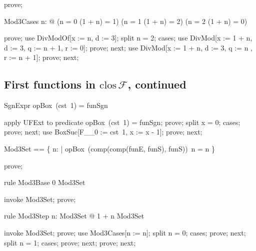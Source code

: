 \documentclass{article}
\begin{document}
\begin{zproof}
prove;
\end{zproof}

\begin{theorem}{Mod3Cases}
  \forall n: \nat @ (n  = 0 \land (1 + n)  = 1) \lor (n  = 1 \land (1 + n)  = 2)
    \lor (n  = 2 \land (1 + n)  = 0)
\end{theorem}

\begin{zproof}
prove;
use DivModOf[x := n, d := 3];
split n  = 2;
cases;
use DivMod[x := 1 + n, d := 3, q := n  + 1, r := 0];
prove;
next;
use DivMod[x := 1 + n, d := 3, q := n , r := n  + 1];
prove;
next;
\end{zproof}

\subsection{First functions in $\mathrm{clos}\,\mathcal{F}$, continued}

\begin{theorem}{SgnExpr}
  opBox~(cst~1) = funSgn
\end{theorem}

\begin{zproof}
apply UFExt to predicate opBox~(cst~1) = funSgn;
prove;
split x = 0;
cases;
prove;
next;
use BoxSuc[F\_\_0 := cst~1, x := x - 1];
prove;
next;
\end{zproof}

\begin{zed}
  Mod3Set == \{ n: \nat | opBox~(comp(comp(funE, funS), funS))~n = n  \}
\end{zed}

\begin{zproof}
prove;
\end{zproof}

\begin{theorem}{rule Mod3Base}
  0 \in Mod3Set
\end{theorem}

\begin{zproof}
invoke Mod3Set;
prove;
\end{zproof}

\begin{theorem}{rule Mod3Step}
  \forall n: Mod3Set @ 1 + n \in Mod3Set
\end{theorem}

\begin{zproof}
invoke Mod3Set;
prove;
use Mod3Cases[n := n];
split n  = 0;
cases;
prove;
next;
split n  = 1;
cases;
prove;
next;
prove;
next;
\end{zproof}
\end{document}
